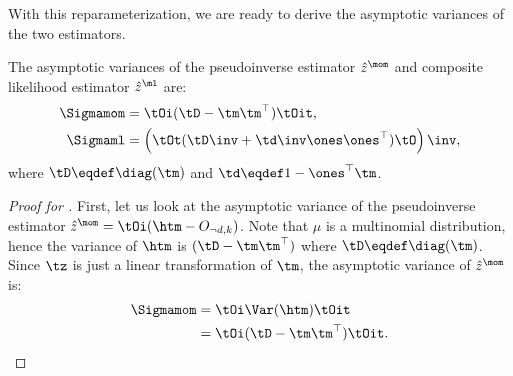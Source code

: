 With this reparameterization, we are ready to derive the asymptotic
variances of the two estimators.

\begin{lemma*}
  The asymptotic variances of the pseudoinverse estimator $\hat z^\mom$
  and composite likelihood estimator $\hat z^\ml$ are:
  \begin{align*}
    \Sigmamom 
      &= \tOi (\tD - \tm \tm^\top) \tOit, \\
    \Sigmaml 
      &=
      \left( \tOt (\tD\inv + \td\inv \ones\ones^\top) \tO \right)\inv,
  \end{align*}
  where $\tD \eqdef \diag(\tm)$ and $\td \eqdef 1 - \ones^\top\tm$.
\end{lemma*}
\begin{proof}[Proof for ]
  First, let us look at the
  asymptotic variance of the pseudoinverse estimator
  $\hat{z}^\mom = \tOi (\htm - O_{\neg d,k})$. 
  Note that $\mu$ is a multinomial distribution, hence the variance of
    $\htm$ is $(\tD - \tm \tm^\top)$ where $\tD \eqdef \diag(\tm)$.
  Since $\tz$ is just a linear transformation of $\tm$,
  the asymptotic variance of $\hat{z}^\mom$ is:
  \begin{align*}
      \Sigmamom &= \tOi \Var(\htm) \tOit \\
      &= \tOi (\tD - \tm \tm^\top) \tOit.
  \end{align*}
  

\end{proof}

